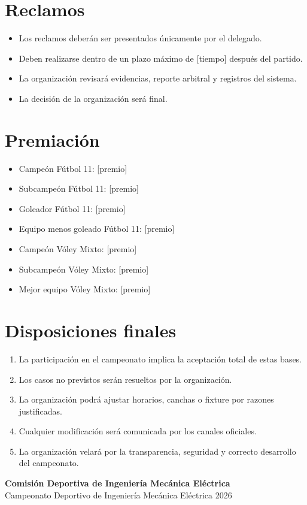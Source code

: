 \documentclass[12pt,a4paper]{article}
\begin{document}
\section{Reclamos}

\begin{itemize}
  \item Los reclamos deberán ser presentados únicamente por el delegado.
  \item Deben realizarse dentro de un plazo máximo de [tiempo] después del partido.
  \item La organización revisará evidencias, reporte arbitral y registros del sistema.
  \item La decisión de la organización será final.
\end{itemize}

\section{Premiación}

\begin{itemize}
  \item Campeón Fútbol 11: [premio]
  \item Subcampeón Fútbol 11: [premio]
  \item Goleador Fútbol 11: [premio]
  \item Equipo menos goleado Fútbol 11: [premio]
  \item Campeón Vóley Mixto: [premio]
  \item Subcampeón Vóley Mixto: [premio]
  \item Mejor equipo Vóley Mixto: [premio]
\end{itemize}

\section{Disposiciones finales}

\begin{enumerate}
  \item La participación en el campeonato implica la aceptación total de estas bases.
  \item Los casos no previstos serán resueltos por la organización.
  \item La organización podrá ajustar horarios, canchas o fixture por razones justificadas.
  \item Cualquier modificación será comunicada por los canales oficiales.
  \item La organización velará por la transparencia, seguridad y correcto desarrollo del campeonato.
\end{enumerate}

\vfill
\begin{center}
  \textcolor{imegreen}{\textbf{Comisión Deportiva de Ingeniería Mecánica Eléctrica}}\\
  Campeonato Deportivo de Ingeniería Mecánica Eléctrica 2026
\end{center}
\end{document}
